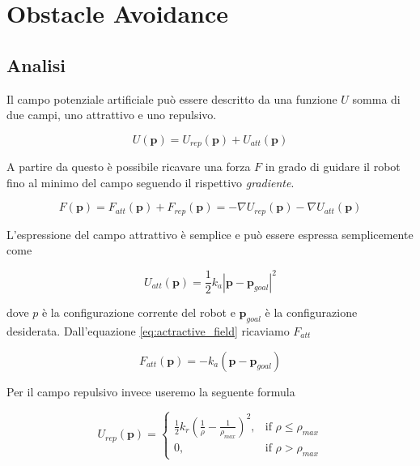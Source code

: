 \documentclass[a4paper,10pt]{article}
\begin{document}
\newpage
\section{Obstacle Avoidance}

\subsection{Analisi}

Il campo potenziale artificiale può essere descritto da una funzione $U$ somma di due campi, uno attrattivo e uno repulsivo.

\begin{equation}
U(\mathbf{p}) = U_{rep}(\mathbf{p}) + U_{att}(\mathbf{p})
\end{equation}

A partire da questo è possibile ricavare una forza $F$ in grado di guidare il robot fino al minimo del campo seguendo il rispettivo \emph{gradiente}.

\begin{equation}
F(\mathbf{p}) = F_{att}(\mathbf{p}) + F_{rep}(\mathbf{p}) = - \nabla U_{rep}(\mathbf{p}) - \nabla U_{att}(\mathbf{p})
\end{equation}

L'espressione del campo attrattivo è semplice e può essere espressa semplicemente come

\begin{equation}
U_{att}(\mathbf{p}) = \frac{1}{2} k_a |\mathbf{p}-\mathbf{p}_{goal}|^2
\label{eq:actractive_field}
\end{equation}

dove $p$ è la configurazione corrente del robot e $\mathbf{p}_{goal}$ è la configurazione desiderata. Dall'equazione \ref{eq:actractive_field} ricaviamo $F_{att}$

\begin{equation}
F_{att}(\mathbf{p}) = - k_a (\mathbf{p} - \mathbf{p}_{goal})
\label{eq:attractive_force}
\end{equation}

Per il campo repulsivo invece useremo la seguente formula

\begin{equation}
U_{rep}(\mathbf{p}) = \begin{cases}
\frac{1}{2} k_r  \left( \frac{1}{\rho} - \frac{1}{\rho_{max}} \right)^2 ,& \mbox{if } \rho \le \rho_{max} \\
0 ,& \mbox{if } \rho > \rho_{max}
\end{cases}
\label{eq:repulsive_field}
\end{equation}
\end{document}
